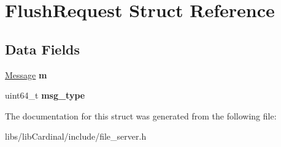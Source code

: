 \hypertarget{structFlushRequest}{}\section{Flush\+Request Struct Reference}
\label{structFlushRequest}
\subsection*{Data Fields}
\begin{DoxyCompactItemize}
\item 
\hyperlink{structMessage}{Message} {\bfseries m}\hypertarget{structFlushRequest_a10850e0a9a015be36a4d6edcc62b2d26}{}\label{structFlushRequest_a10850e0a9a015be36a4d6edcc62b2d26}

\item 
uint64\+\_\+t {\bfseries msg\+\_\+type}\hypertarget{structFlushRequest_a659b32306b48c5c41e2261f9456f2a8e}{}\label{structFlushRequest_a659b32306b48c5c41e2261f9456f2a8e}

\end{DoxyCompactItemize}


The documentation for this struct was generated from the following file\+:\begin{DoxyCompactItemize}
\item 
libs/lib\+Cardinal/include/file\+\_\+server.\+h\end{DoxyCompactItemize}
